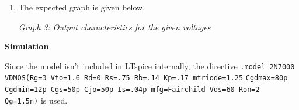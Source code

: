\documentclass[11pt]{article}
\begin{document}
\begin{enumerate}[leftmargin=*,label=\textbf{\arabic*.}]
\begin{center}
\small \textit{Graph 2: Transfer characteristics for the given voltages}
\end{center}

\item The expected graph is given below.

\begin{center}

\small \textit{Graph 3: Output characteristics for the given voltages}
\end{center}

\end{enumerate}

\textbf{Simulation}

\vspace{1em}

\noindent Since the model isn't included in LTspice internally, the directive \verb|.model 2N7000 VDMOS(Rg=3 Vto=1.6 Rd=0 Rs=.75 Rb=.14 Kp=.17 mtriode=1.25| \verb|Cgdmax=80p Cgdmin=12p Cgs=50p Cjo=50p Is=.04p mfg=Fairchild Vds=60 Ron=2| \verb| Qg=1.5n)| is used.

\newpage
\end{document}
